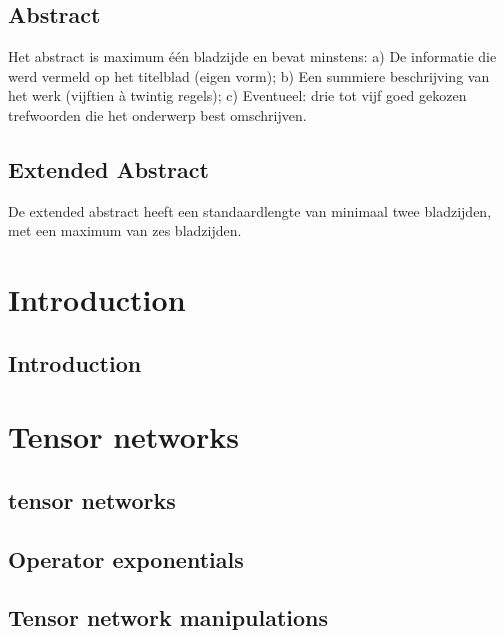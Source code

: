 \documentclass{book}
\begin{document}

\section*{Abstract}

Het abstract is maximum één bladzijde en bevat minstens:
a) De informatie die werd vermeld op het titelblad (eigen vorm);
b) Een summiere beschrijving van het werk (vijftien à twintig regels);
c) Eventueel: drie tot vijf goed gekozen trefwoorden die het onderwerp best
omschrijven.


\section*{Extended Abstract}

De extended abstract heeft een standaardlengte van minimaal twee bladzijden, met een maximum van zes bladzijden.

\tableofcontents

\listoffigures

\mainmatter

\chapter{Introduction}

\section{Introduction}


\chapter{Tensor networks}

\section{tensor networks}


\section{Operator exponentials}


\section{Tensor network manipulations}

\end{document}
